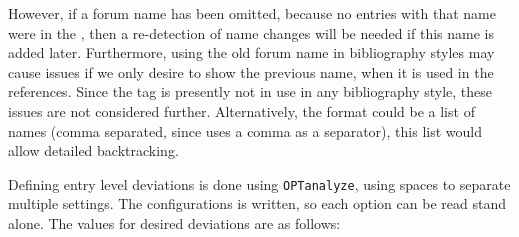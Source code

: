 However, if a forum name has been omitted, because no entries with
that name were in the , then a re-detection of name changes
will be needed if this name is added later.  Furthermore, using the
old forum name in bibliography styles may cause issues if we only
desire to show the previous name, when it is used in the references.
Since the tag is presently not in use in any bibliography style, these
issues are not considered further.  Alternatively, the format could be
a list of names (comma separated, since {\bibtex} uses a comma as a
separator), this list would allow detailed backtracking.

Defining entry level deviations is done using \texttt{OPTanalyze},
using spaces to separate multiple settings.  The configurations is
written, so each option can be read stand alone.  The values for
desired deviations are as follows:

